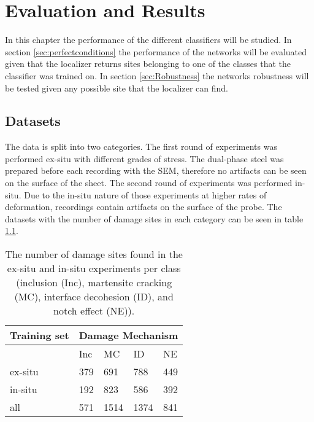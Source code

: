 
\chapter{Evaluation and Results} %

\label{Performance} %

In this chapter the performance of the different classifiers will be studied. In section \ref{sec:perfectconditions} the performance of the networks will be evaluated given that the localizer returns sites belonging to one of the classes that the classifier was trained on. In section \ref{sec:Robustness} the networks robustness will be tested given any possible site that the localizer can find. 

\section{Datasets}
The data is split into two categories. The first round of experiments was performed ex-situ with different grades of stress. The dual-phase steel was prepared before each recording with the SEM, therefore no artifacts can be seen on the surface of the sheet. The second round of experiments was performed in-situ. Due to the in-situ nature of those experiments at higher rates of deformation, recordings contain artifacts on the surface of the probe. The datasets with the number of damage sites in each category can be seen in table \ref{tab:Dataset}. \\ 

\begin{table}[H]
\begin{center}
\begin{tabular}{@{} *5l @{}} \toprule[2pt]
Training set &  \multicolumn{4}{c}{Damage Mechanism}   \\\midrule
 & Inc & MC & ID & NE   \\ 
ex-situ  & 379 & 691 & 788 & 449\\ 
in-situ  & 192 & 823 & 586 & 392 \\ \bottomrule
all  & 571 & 1514 & 1374 & 841\\\bottomrule[2pt]

\end{tabular}
 \caption{The number of damage sites found in the ex-situ and in-situ experiments per class (inclusion (Inc), martensite cracking (MC), interface decohesion (ID), and notch effect (NE)).}
 \label{tab:Dataset}
\end{center}
\end{table}


